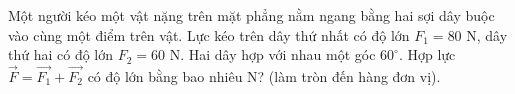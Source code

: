 \begin{bt}%
Một người kéo một vật nặng trên mặt phẳng nằm ngang bằng hai sợi dây buộc vào cùng một điểm trên vật. Lực kéo trên dây thứ nhất có độ lớn $F_1 = 80$ N, dây thứ hai có độ lớn $F_2 = 60$ N. Hai dây hợp với nhau một góc $60^\circ$. Hợp lực $\overrightarrow{F} = \overrightarrow{F_1}+\overrightarrow{F_2}$ có độ lớn bằng bao nhiêu N? (làm tròn đến hàng đơn vị).

\end{bt}
